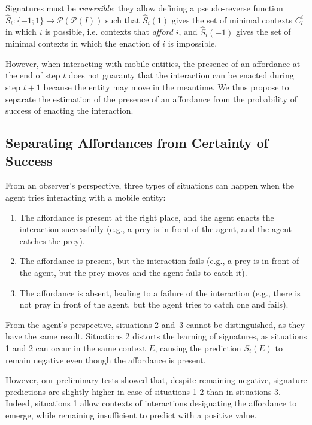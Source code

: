 \documentclass[conference]{IEEEtran}
\begin{document}
Signatures must be \textit{reversible}: they allow defining a pseudo-reverse function $\hat{S}_i : \{-1;1\} \rightarrow \mathcal{P}(\mathcal{P}(I))$ such that  $\hat{S}_i(1)$ gives the set of minimal contexts $C_l^i$ in which $i$ is possible, i.e. contexts that \textit{afford} $i$, and $\hat{S}_i(-1)$ gives the set of minimal contexts in which the enaction of $i$ is impossible.


However, when interacting with mobile entities, the presence of an affordance at the end of step $t$ does not guaranty that the interaction can be enacted during step $t+1$ because the entity may move in the meantime. We thus propose to separate the estimation of the presence of an affordance from the probability of success of enacting the interaction.




\subsection{Separating Affordances from Certainty of Success}\label{separate}

From an observer's perspective, three types of situations can happen when the agent tries interacting with a mobile entity:

\begin{enumerate}
\item The affordance is present at the right place, and the agent enacts the interaction successfully (e.g., a prey is in front of the agent, and the agent catches the prey).
\item The affordance is present, but the interaction fails (e.g., a prey is in front of the agent, but the prey moves and the agent fails to catch it).
\item The affordance is absent, leading to a failure of the interaction (e.g., there is not pray in front of the agent, but the agent tries to catch one and fails).
\end{enumerate}

From the agent's perspective, situations 2 and~3 cannot be distinguished, as they have the same result.
Situations 2 distorts the learning of signatures, as situations 1 and 2 can occur in the same context $E$, causing the prediction $S_i(E)$ to remain negative even though the affordance is present.


However, our preliminary tests showed that, despite remaining negative, signature predictions are slightly higher in case of situations 1-2 than in situations 3. Indeed, situations 1 allow contexts of interactions designating the affordance to emerge, while remaining insufficient to predict with a positive value.
\end{document}
